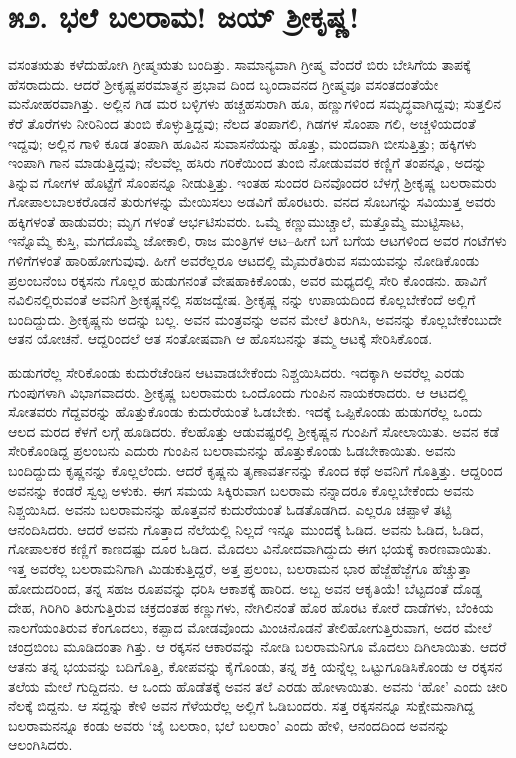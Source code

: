 
\chapter{೫೨. ಭಲೆ ಬಲರಾಮ! ಜಯ್ ಶ್ರೀಕೃಷ್ಣ!}

ವಸಂತಋತು ಕಳೆದುಹೋಗಿ ಗ್ರೀಷ್ಮಋತು ಬಂದಿತ್ತು. ಸಾಮಾನ್ಯವಾಗಿ ಗ್ರೀಷ್ಮ ವೆಂದರೆ ಬಿರು ಬೇಸಿಗೆಯ ತಾಪಕ್ಕೆ ಹೆಸರಾದುದು. ಆದರೆ ಶ್ರೀಕೃಷ್ಣಪರಮಾತ್ಮನ ಪ್ರಭಾವ ದಿಂದ ಬೃಂದಾವನದ ಗ್ರೀಷ್ಮವೂ ವಸಂತದಂತೆಯೇ ಮನೋಹರವಾಗಿತ್ತು. ಅಲ್ಲಿನ ಗಿಡ ಮರ ಬಳ್ಳಿಗಳು ಹಚ್ಚಹಸುರಾಗಿ ಹೂ, ಹಣ್ಣುಗಳಿಂದ ಸಮೃದ್ಧವಾಗಿದ್ದವು; ಸುತ್ತಲಿನ ಕೆರೆ ತೊರೆಗಳು ನೀರಿನಿಂದ ತುಂಬಿ ಕೊಳ್ಳುತ್ತಿದ್ದವು; ನೆಲದ ತಂಪಾಗಲಿ, ಗಿಡಗಳ ಸೊಂಪಾ ಗಲಿ, ಅಚ್ಚಳಿಯದಂತೆ ಇದ್ದವು; ಅಲ್ಲಿನ ಗಾಳಿ ಕೂಡ ತಂಪಾಗಿ ಹೂವಿನ ಸುವಾಸನೆಯನ್ನು ಹೊತ್ತು, ಮಂದವಾಗಿ ಬೀಸುತ್ತಿತ್ತು; ಹಕ್ಕಿಗಳು ಇಂಪಾಗಿ ಗಾನ ಮಾಡುತ್ತಿದ್ದವು; ನೆಲವೆಲ್ಲ ಹಸಿರು ಗರಿಕೆಯಿಂದ ತುಂಬಿ ನೋಡುವವರ ಕಣ್ಣಿಗೆ ತಂಪನ್ನೂ, ಅದನ್ನು ತಿನ್ನುವ ಗೋಗಳ ಹೊಟ್ಟೆಗೆ ಸೊಂಪನ್ನೂ ನೀಡುತ್ತಿತ್ತು. ಇಂತಹ ಸುಂದರ ದಿನವೊಂದರ ಬೆಳಗ್ಗೆ ಶ್ರೀಕೃಷ್ಣ ಬಲರಾಮರು ಗೋಪಾಲಬಾಲಕರೊಡನೆ ತುರುಗಳನ್ನು ಮೇಯಿಸಲು ಅಡವಿಗೆ ಹೊರಟರು. ವನದ ಸೊಬಗನ್ನು ಸವಿಯುತ್ತ ಅವರು ಹಕ್ಕಿಗಳಂತೆ ಹಾಡುವರು; ಮೃಗ ಗಳಂತೆ ಆರ್ಭಟಿಸುವರು. ಒಮ್ಮೆ ಕಣ್ಣುಮುಚ್ಚಾಲೆ, ಮತ್ತೊಮ್ಮೆ ಮುಟ್ಟಿಸಾಟ, ಇನ್ನೊಮ್ಮೆ ಕುಸ್ತಿ, ಮಗದೊಮ್ಮೆ ಜೋಕಾಲಿ, ರಾಜ ಮಂತ್ರಿಗಳ ಆಟ–ಹೀಗೆ ಬಗೆ ಬಗೆಯ ಆಟಗಳಿಂದ ಅವರ ಗಂಟೆಗಳು ಗಳಿಗೆಗಳಂತೆ ಹಾರಿಹೋಗುವುವು. ಹೀಗೆ ಅವರೆಲ್ಲರೂ ಆಟದಲ್ಲಿ ಮೈಮರೆತಿರುವ ಸಮಯವನ್ನು ನೋಡಿಕೊಂಡು ಪ್ರಲಂಬನೆಂಬ ರಕ್ಕಸನು ಗೊಲ್ಲರ ಹುಡುಗನಂತೆ ವೇಷಹಾಕಿಕೊಂಡು, ಅವರ ಮಧ್ಯದಲ್ಲಿ ಸೇರಿ ಕೊಂಡನು. ಹಾವಿಗೆ ನವಿಲಿನಲ್ಲಿರುವಂತೆ ಅವನಿಗೆ ಶ್ರೀಕೃಷ್ಣನಲ್ಲಿ ಸಹಜದ್ವೇಷ. ಶ್ರೀಕೃಷ್ಣ ನನ್ನು ಉಪಾಯದಿಂದ ಕೊಲ್ಲಬೇಕೆಂದೆ ಅಲ್ಲಿಗೆ ಬಂದಿದ್ದುದು. ಶ್ರೀಕೃಷ್ಣನು ಅದನ್ನು ಬಲ್ಲ. ಅವನ ಮಂತ್ರವನ್ನು ಅವನ ಮೇಲೆ ತಿರುಗಿಸಿ, ಅವನನ್ನು ಕೊಲ್ಲಬೇಕೆಂಬುದೇ ಆತನ ಯೋಚನೆ. ಆದ್ದರಿಂದಲೆ ಆತ ಸಂತೋಷವಾಗಿ ಆ ಹೊಸಬನನ್ನು ತಮ್ಮ ಆಟಕ್ಕೆ ಸೇರಿಸಿಕೊಂಡ.

 ಹುಡುಗರೆಲ್ಲ ಸೇರಿಕೊಂಡು ಕುದುರೆಚೆಂಡಿನ ಆಟವಾಡಬೇಕೆಂದು ನಿಶ್ಚಯಿಸಿದರು. ಇದಕ್ಕಾಗಿ ಅವರೆಲ್ಲ ಎರಡು ಗುಂಪುಗಳಾಗಿ ವಿಭಾಗವಾದರು. ಶ್ರೀಕೃಷ್ಣ ಬಲರಾಮರು ಒಂದೊಂದು ಗುಂಪಿನ ನಾಯಕರಾದರು. ಆ ಆಟದಲ್ಲಿ ಸೋತವರು ಗೆದ್ದವರನ್ನು ಹೊತ್ತುಕೊಂಡು ಕುದುರೆಯಂತೆ ಓಡಬೇಕು. ಇದಕ್ಕೆ ಒಪ್ಪಿಕೊಂಡು ಹುಡುಗರೆಲ್ಲ ಒಂದು ಆಲದ ಮರದ ಕೆಳಗೆ ಲಗ್ಗೆ ಹೂಡಿದರು. ಕೆಲಹೊತ್ತು ಆಡುವಷ್ಟರಲ್ಲಿ ಶ್ರೀಕೃಷ್ಣನ ಗುಂಪಿಗೆ ಸೋಲಾಯಿತು. ಅವನ ಕಡೆ ಸೇರಿಕೊಂಡಿದ್ದ ಪ್ರಲಂಬನು ಎದುರು ಗುಂಪಿನ ಬಲರಾಮನನ್ನು ಹೊತ್ತುಕೊಂಡು ಓಡಬೇಕಾಯಿತು. ಅವನು ಬಂದಿದ್ದುದು ಕೃಷ್ಣನನ್ನು ಕೊಲ್ಲಲೆಂದು. ಆದರೆ ಕೃಷ್ಣನು ತೃಣಾವರ್ತನನ್ನು ಕೊಂದ ಕಥೆ ಅವನಿಗೆ ಗೊತ್ತಿತ್ತು. ಆದ್ದರಿಂದ ಅವನನ್ನು ಕಂಡರೆ ಸ್ವಲ್ಪ ಅಳುಕು. ಈಗ ಸಮಯ ಸಿಕ್ಕಿರುವಾಗ ಬಲರಾಮ ನನ್ನಾದರೂ ಕೊಲ್ಲಬೇಕೆಂದು ಅವನು ನಿಶ್ಚಯಿಸಿದ. ಅವನು ಬಲರಾಮನನ್ನು ಹೊತ್ತವನೆ ಕುದುರೆಯಂತೆ ಓಡತೊಡಗಿದ. ಎಲ್ಲರೂ ಚಪ್ಪಾಳೆ ತಟ್ಟಿ ಆನಂದಿಸಿದರು. ಆದರೆ ಅವನು ಗೊತ್ತಾದ ನೆಲೆಯಲ್ಲಿ ನಿಲ್ಲದೆ ಇನ್ನೂ ಮುಂದಕ್ಕೆ ಓಡಿದ. ಅವನು ಓಡಿದ, ಓಡಿದ, ಗೋಪಾಲಕರ ಕಣ್ಣಿಗೆ ಕಾಣದಷ್ಟು ದೂರ ಓಡಿದ. ಮೊದಲು ವಿನೋದವಾಗಿದ್ದುದು ಈಗ ಭಯಕ್ಕೆ ಕಾರಣವಾಯಿತು. ಇತ್ತ ಅವರೆಲ್ಲ ಬಲರಾಮನಿಗಾಗಿ ಮಿಡುಕುತ್ತಿದ್ದರೆ, ಅತ್ತ ಪ್ರಲಂಬ, ಬಲರಾಮನ ಭಾರ ಹೆಜ್ಜೆಹೆಜ್ಜೆಗೂ ಹೆಚ್ಚುತ್ತಾ ಹೋದುದರಿಂದ, ತನ್ನ ಸಹಜ ರೂಪವನ್ನು ಧರಿಸಿ ಆಕಾಶಕ್ಕೆ ಹಾರಿದ. ಅಬ್ಬ ಅವನ ಆಕೃತಿಯೆ! ಬೆಟ್ಟದಂತೆ ದೊಡ್ಡ ದೇಹ, ಗಿರಿಗಿರಿ ತಿರುಗುತ್ತಿರುವ ಚಕ್ರದಂತಹ ಕಣ್ಣುಗಳು, ನೇಗಿಲಿನಂತೆ ಹೊರ ಹೊರಟ ಕೋರೆ ದಾಡೆಗಳು, ಬೆಂಕಿಯ ನಾಲಗೆಯಂತಿರುವ ಕೆಂಗೂದಲು, ಕಪ್ಪಾದ ಮೋಡವೊಂದು ಮಿಂಚಿನೊಡನೆ ತೇಲಿಹೋಗುತ್ತಿರುವಾಗ, ಅದರ ಮೇಲೆ ಚಂದ್ರಬಿಂಬ ಮೂಡಿದಂತಾ ಗಿತ್ತು. ಆ ರಕ್ಕಸನ ಆಕಾರವನ್ನು ನೋಡಿ ಬಲರಾಮನಿಗೂ ಮೊದಲು ದಿಗಿಲಾಯಿತು. ಆದರೆ ಆತನು ತನ್ನ ಭಯವನ್ನು ಬದಿಗೊತ್ತಿ, ಕೋಪವನ್ನು ಕೈಗೊಂಡು, ತನ್ನ ಶಕ್ತಿ ಯನ್ನೆಲ್ಲ ಒಟ್ಟುಗೂಡಿಸಿಕೊಂಡು ಆ ರಕ್ಕಸನ ತಲೆಯ ಮೇಲೆ ಗುದ್ದಿದನು. ಆ ಒಂದು ಹೊಡೆತಕ್ಕೆ ಅವನ ತಲೆ ಎರಡು ಹೋಳಾಯಿತು. ಅವನು ‘ಹೋ’ ಎಂದು ಚೀರಿ ನೆಲಕ್ಕೆ ಬಿದ್ದನು. ಆ ಸದ್ದನ್ನು ಕೇಳಿ ಅವನ ಗೆಳೆಯರೆಲ್ಲ ಅಲ್ಲಿಗೆ ಓಡಿಬಂದರು. ಸತ್ತ ರಕ್ಕಸನನ್ನೂ ಸುಕ್ಷೇಮನಾಗಿದ್ದ ಬಲರಾಮನನ್ನೂ ಕಂಡು ಅವರು ‘ಜೈ ಬಲರಾಂ, ಭಲೆ ಬಲರಾಂ’ ಎಂದು ಹೇಳಿ, ಆನಂದದಿಂದ ಅವನನ್ನು ಆಲಂಗಿಸಿದರು.

